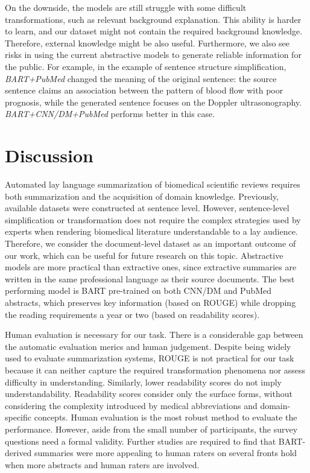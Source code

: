 \documentclass[letterpaper, table]{article}
\begin{document}
On the downside, the  models are still struggle with some difficult transformations, such as relevant background explanation. This ability is harder to learn, and our dataset might not contain the required background knowledge.
Therefore, external knowledge might be also useful.
Furthermore, we also see risks in using the current abstractive models to generate reliable information for the public. For example, in the example of sentence structure simplification, \textit{BART+PubMed} changed the meaning of the original sentence: the source sentence claims an association between the pattern of blood flow with poor prognosis, while the generated sentence focuses on the Doppler ultrasonography. \textit{BART+CNN/DM+PubMed}
performs better in this case.












\section{Discussion}
Automated lay language summarization of biomedical scientific reviews requires both summarization and the acquisition of domain knowledge.
Previously, available datasets
were constructed at sentence level. However, sentence-level simplification or transformation does not require the complex strategies used by experts when rendering biomedical literature understandable to a lay audience. Therefore, we consider the
document-level dataset as an important outcome of our work,  which
can be useful for future research on this topic.
Abstractive models are more practical than extractive ones,
since extractive summaries
are written
in the same professional language as their source documents.
The best performing model is BART pre-trained on both CNN/DM and PubMed abstracts, which preserves key information (based on ROUGE) while dropping the reading requirements a year or two (based on readability scores).

Human evaluation is necessary for our task.
There is a considerable gap between the automatic evaluation merics
and human judgement.
Despite being widely used to evaluate summarization systems, ROUGE is not practical for our task because it can neither capture the required transformation phenomena nor assess difficulty in understanding.
Similarly, lower readability scores do not imply understandability.
Readability scores consider only the surface forms,
without considering the complexity introduced by medical abbreviations and domain-specific concepts.
Human evaluation is the most robust method to evaluate the performance.
However, aside from the small number of participants,
the survey questions need a formal validity.
Further studies are required to find that BART-derived summaries were more appealing to human raters on several fronts hold when more abstracts and human raters are involved.
\end{document}
